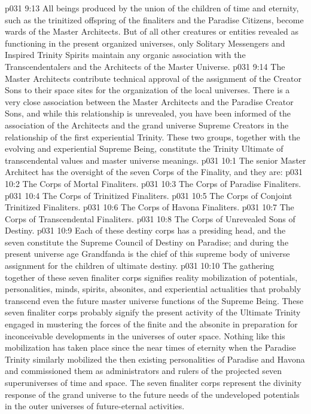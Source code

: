 \vs p031 9:13 All beings produced by the union of the children of time and eternity, such as the trinitized offspring of the finaliters and the Paradise Citizens, become wards of the Master Architects. But of all other creatures or entities revealed as functioning in the present organized universes, only Solitary Messengers and Inspired Trinity Spirits maintain any organic association with the Transcendentalers and the Architects of the Master Universe.
\vs p031 9:14 The Master Architects contribute technical approval of the assignment of the Creator Sons to their space sites for the organization of the local universes. There is a very close association between the Master Architects and the Paradise Creator Sons, and while this relationship is unrevealed, you have been informed of the association of the Architects and the grand universe Supreme Creators in the relationship of the first experiential Trinity. These two groups, together with the evolving and experiential Supreme Being, constitute the Trinity Ultimate of transcendental values and master universe meanings.\plusone
{}
\vs p031 10:1 The senior Master Architect has the oversight of the seven Corps of the Finality, and they are:
\pc \vs p031 10:2 \bibnobreakspace The Corps of Mortal Finaliters.
\vs p031 10:3 \bibnobreakspace The Corps of Paradise Finaliters.
\vs p031 10:4 \bibnobreakspace The Corps of Trinitized Finaliters.
\vs p031 10:5 \bibnobreakspace The Corps of Conjoint Trinitized Finaliters.
\vs p031 10:6 \bibnobreakspace The Corps of Havona Finaliters.
\vs p031 10:7 \bibnobreakspace The Corps of Transcendental Finaliters.
\vs p031 10:8 \bibnobreakspace The Corps of Unrevealed Sons of Destiny.
\vs p031 10:9 Each of these destiny corps has a presiding head, and the seven constitute the Supreme Council of Destiny on Paradise; and during the present universe age Grandfanda is the chief of this supreme body of universe assignment for the children of ultimate destiny.
\vs p031 10:10 The gathering together of these seven finaliter corps signifies reality mobilization of potentials, personalities, minds, spirits, absonites, and experiential actualities that probably transcend even the future master universe functions of the Supreme Being. These seven finaliter corps probably signify the present activity of the Ultimate Trinity engaged in mustering the forces of the finite and the absonite in preparation for inconceivable developments in the universes of outer space. Nothing like this mobilization has taken place since the near times of eternity when the Paradise Trinity similarly mobilized the then existing personalities of Paradise and Havona and commissioned them as administrators and rulers of the projected seven superuniverses of time and space. The seven finaliter corps represent the divinity response of the grand universe to the future needs of the undeveloped potentials in the outer universes of future\hyp{}eternal activities.
